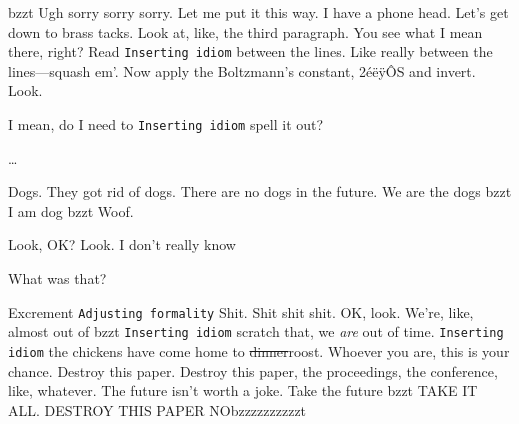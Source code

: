 \documentclass[12pt]{sigbovik-review}
\begin{document}
bzzt Ugh sorry sorry sorry.
Let me put it this way.
I have a phone head.
Let's get down to brass tacks.
Look at, like, the third paragraph.
You see what I mean there, right?
Read \texttt{Inserting idiom} between the lines.
Like really between the lines—squash em'.
Now apply the Boltzmann's constant, 2éëÿÔS and invert.
Look.

I mean, do I need to \texttt{Inserting idiom} spell it out?

…

Dogs.
They got rid of dogs.
There are no dogs in the future.
We are the dogs bzzt I am dog bzzt Woof.

Look, OK?
Look.
I don't really know

What was that?

Excrement \texttt{Adjusting formality} Shit.
Shit shit shit.
OK, look.
We're, like, almost out of bzzt \texttt{Inserting idiom} scratch that, we \textit{are} out of time.
\texttt{Inserting idiom} the chickens have come home to \sout{dinner}roost.
Whoever you are, this is your chance.
Destroy this paper.
Destroy this paper, the proceedings, the conference, like, whatever.
The future isn't worth a joke.
Take the future bzzt TAKE IT ALL.
DESTROY THIS PAPER NObzzzzzzzzzzt
\end{document}
